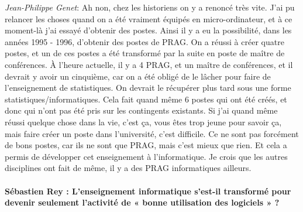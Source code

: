 \noindent\emph{Jean-Philippe Genet}: Ah non, chez les historiens on y a renoncé très vite. J'ai pu relancer les choses quand on a été vraiment équipés en micro-ordinateur, et à ce moment-là j'ai essayé d'obtenir des postes. Ainsi il y a eu la possibilité, dans les années 1995 - 1996, d'obtenir des postes de PRAG. On a réussi à créer quatre postes, et un de ces postes a été transformé par la suite en poste de maître de conférences. À l'heure actuelle, il y a 4 PRAG, et un maître de conférences, et il devrait y avoir un cinquième, car on a été obligé de le lâcher pour faire de l'enseignement de statistiques. On devrait le récupérer plus tard sous une forme statistiques/informatiques. Cela fait quand même 6 postes qui ont été créés, et donc qui n'ont pas été pris sur les contingents existants. Si j'ai quand même réussi quelque chose dans la vie, c'est ça, vous êtes trop jeune pour savoir ça, mais faire créer un poste dans l'université, c'est difficile. Ce ne sont pas forcément de bons postes, car ils ne sont que PRAG, mais c'est mieux que rien. Et cela a permis de développer cet enseignement à l'informatique. Je crois que les autres disciplines ont fait de même, il y a des PRAG informatiques ailleurs.

\paragraph*{Sébastien Rey : L'enseignement informatique s'est-il transformé pour devenir seulement l'activité de « bonne  utilisation des logiciels » ?  }

